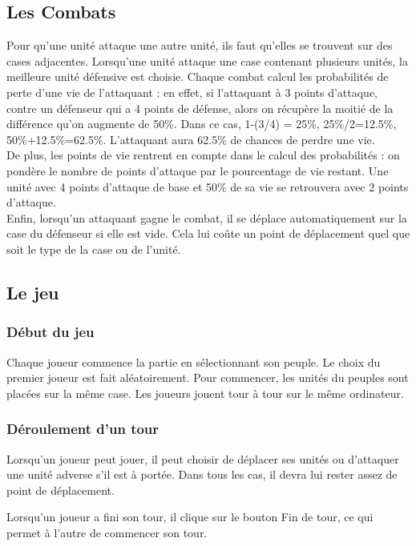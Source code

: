 \subsection{Les Combats}
Pour qu'une unité attaque une autre unité, ils faut qu'elles se trouvent sur des cases adjacentes. Lorsqu'une unité attaque une case contenant plusieurs unités, la meilleure unité défensive est choisie. Chaque combat calcul les probabilités de perte d'une vie de l'attaquant : en effet, si l'attaquant à 3 points d'attaque, contre un défenseur qui a 4 points de défense, alors on récupère la moitié de la différence qu'on augmente de 50\%. Dans ce cas, 1-(3/4) = 25\%, 25\%/2=12.5\%, 50\%+12.5\%=62.5\%. L'attaquant aura 62.5\% de chances de perdre une vie.\newline \\
De plus, les points de vie rentrent en compte dans le calcul des probabilités : on pondère le nombre de points d'attaque par le pourcentage de vie restant. Une unité avec 4 points d'attaque de base et 50\% de sa vie se retrouvera avec 2 points d'attaque.\newline \\
Enfin, lorsqu'un attaquant gagne le combat, il se déplace automatiquement sur la case du défenseur si elle est vide. Cela lui coûte un point de déplacement quel que soit le type de la case ou de l'unité.

\subsection{Le jeu}
\subsubsection{Début du jeu}
Chaque joueur commence la partie en sélectionnant son peuple. Le choix du premier joueur est fait aléatoirement. Pour commencer, les unités du peuples sont placées sur la même case. Les joueurs jouent tour à tour sur le même ordinateur.
\subsubsection{Déroulement d'un tour}
Lorsqu'un joueur peut jouer, il peut choisir de déplacer ses unités ou d'attaquer une unité adverse s'il est à portée. Dans tous les cas, il devra lui rester assez de point de déplacement.

Lorsqu'un joueur a fini son tour, il clique sur le bouton Fin de tour, ce qui permet à l'autre de commencer son tour.
